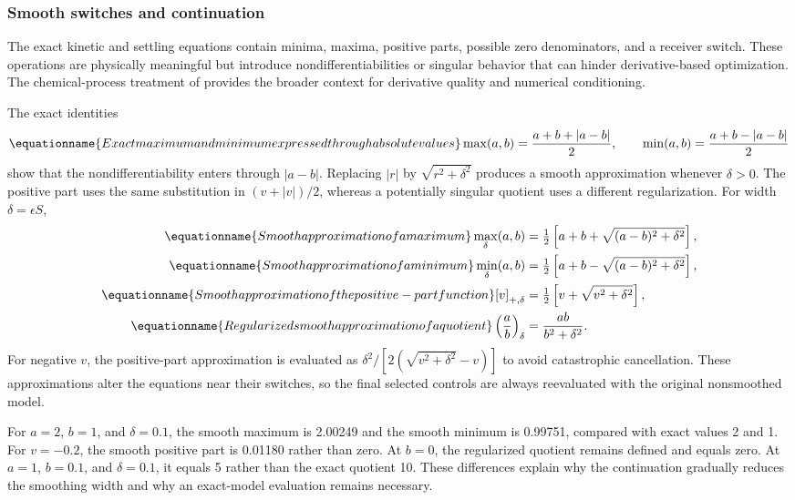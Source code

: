 \subsubsection{Smooth switches and continuation}

The exact kinetic and settling equations contain minima, maxima, positive parts, possible zero denominators, and a receiver switch. These operations are physically meaningful but introduce nondifferentiabilities or singular behavior that can hinder derivative-based optimization. The chemical-process treatment of \citet{BuzziFerraris2013} provides the broader context for derivative quality and numerical conditioning.

The exact identities
\begin{equation}
\equationname{Exact maximum and minimum expressed through absolute values}
\max(a,b)=\frac{a+b+|a-b|}{2},\qquad
\min(a,b)=\frac{a+b-|a-b|}{2}
\end{equation}
show that the nondifferentiability enters through $|a-b|$. Replacing $|r|$ by $\sqrt{r^2+\delta^2}$ produces a smooth approximation whenever $\delta>0$. The positive part uses the same substitution in $(v+|v|)/2$, whereas a potentially singular quotient uses a different regularization. For width $\delta=\epsilon S$,
\begin{align}
\equationname{Smooth approximation of a maximum}
\max_\delta(a,b)&=\tfrac12\left[a+b+\sqrt{(a-b)^2+\delta^2}\right],\\
\equationname{Smooth approximation of a minimum}
\min_\delta(a,b)&=\tfrac12\left[a+b-\sqrt{(a-b)^2+\delta^2}\right],\\
\equationname{Smooth approximation of the positive-part function}
[v]_{+,\delta}&=\tfrac12\left[v+\sqrt{v^2+\delta^2}\right],\\
\equationname{Regularized smooth approximation of a quotient}
\left(\frac ab\right)_\delta&=\frac{ab}{b^2+\delta^2}.
\label{eq:plant_smooth_operations}
\end{align}
For negative $v$, the positive-part approximation is evaluated as $\delta^2/[2(\sqrt{v^2+\delta^2}-v)]$ to avoid catastrophic cancellation. These approximations alter the equations near their switches, so the final selected controls are always reevaluated with the original nonsmoothed model.

For $a=2$, $b=1$, and $\delta=0.1$, the smooth maximum is 2.00249 and the smooth minimum is 0.99751, compared with exact values 2 and 1. For $v=-0.2$, the smooth positive part is 0.01180 rather than zero. At $b=0$, the regularized quotient remains defined and equals zero. At $a=1$, $b=0.1$, and $\delta=0.1$, it equals 5 rather than the exact quotient 10. These differences explain why the continuation gradually reduces the smoothing width and why an exact-model evaluation remains necessary.

